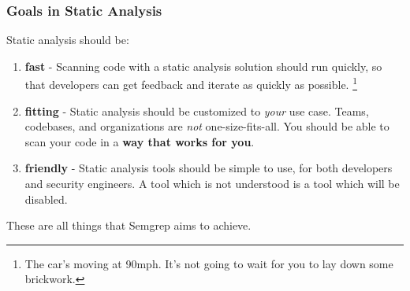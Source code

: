 \documentclass[aspectratio=169, handout]{beamer}
\begin{document}
\begin{frame}[fragile]
  \frametitle{Goals in Static Analysis}

  Static analysis should be:

  \pause
  \vspace{5pt}

  \begin{enumerate}
      \item \textbf{fast} - Scanning code with a static analysis solution should run
      quickly, so that developers can get feedback and iterate as quickly as possible.
      \footnote{The car's moving at 90mph. It's not going to wait for you to lay down some brickwork.}
      \pause
      \item \textbf{fitting} - Static analysis should be customized to \textit{your}
      use case. Teams, codebases, and organizations are \textit{not} one-size-fits-all.
      You should be able to scan your code in a \textbf{way that works for you}.
      \pause
      \item \textbf{friendly} - Static analysis tools should be simple to use, for
      both developers and security engineers. A tool which is not understood is a tool
      which will be disabled.
  \end{enumerate}

  \pause
  \vspace{\fill}

  These are all things that Semgrep aims to achieve.
\end{frame}

\end{document}
